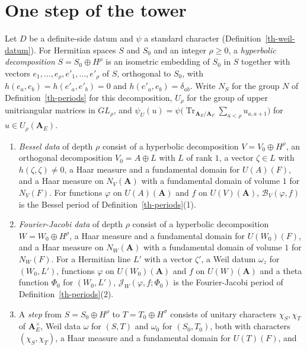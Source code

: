 \section{One step of the tower}\label{section-th-steps}

\begin{definition}\label{th-step}
Let $D$ be a definite-side datum and $\psi$ a standard character
(Definition~\ref{th-weil-datum}). For Hermitian spaces $S$ and $S_0$ and an
integer $\rho\geq0$, a \emph{hyperbolic decomposition} $S=S_0\oplus H^\rho$ is
an isometric embedding of $S_0$ in $S$ together with vectors
$e_1,\ldots,e_\rho,e'_1,\ldots,e'_\rho$ of $S$, orthogonal to $S_0$, with
$h(e_a,e_b)=h(e'_a,e'_b)=0$ and $h(e'_a,e_b)=\delta_{ab}$. Write $N_S$ for the
group $N$ of Definition~\ref{th-periods} for this decomposition, $U_\rho$ for
the group of upper unitriangular matrices in $GL_\rho$, and
$\psi_U(u)=\psi\bigl(\operatorname{Tr}_{\mathbf A_E/\mathbf A_F}\sum_{a<\rho}u_{a,a+1}\bigr)$
for $u\in U_\rho(\mathbf A_E)$.
\begin{enumerate}
\item \emph{Bessel data} of depth $\rho$ consist of a hyperbolic decomposition
  $V=V_0\oplus H^\rho$, an orthogonal decomposition $V_0=A\oplus L$ with $L$ of
  rank $1$, a vector $\zeta\in L$ with $h(\zeta,\zeta)\neq0$, a Haar measure and
  a fundamental domain for $U(A)(F)$, and a Haar measure on $N_V(\mathbf A)$
  with a fundamental domain of volume $1$ for $N_V(F)$. For functions $\varphi$
  on $U(A)(\mathbf A)$ and $f$ on $U(V)(\mathbf A)$, $\mathcal B_V(\varphi,f)$
  is the Bessel period of Definition~\ref{th-periods}(1).
\item \emph{Fourier-Jacobi data} of depth $\rho$ consist of a hyperbolic
  decomposition $W=W_0\oplus H^\rho$, a Haar measure and a fundamental domain for
  $U(W_0)(F)$, and a Haar measure on $N_W(\mathbf A)$ with a fundamental domain
  of volume $1$ for $N_W(F)$. For a Hermitian line $L'$ with a vector $\zeta'$,
  a Weil datum $\omega_z$ for $(W_0,L')$, functions $\varphi$ on
  $U(W_0)(\mathbf A)$ and $f$ on $U(W)(\mathbf A)$ and a theta function
  $\Phi_0$ for $(W_0,L')$, $\mathcal J_W(\varphi,f;\Phi_0)$ is the
  Fourier-Jacobi period of Definition~\ref{th-periods}(2).
\item A \emph{step} from $S=S_0\oplus H^\rho$ to $T=T_0\oplus H^\sigma$ consists
  of unitary characters $\chi_S,\chi_T$ of $\mathbf A_E^\times$, Weil data
  $\omega$ for $(S,T)$ and $\omega_0$ for $(S_0,T_0)$, both with characters
  $(\chi_S,\chi_T)$, a Haar measure and a fundamental domain for $U(T)(F)$, and

\end{enumerate}
\end{definition}
